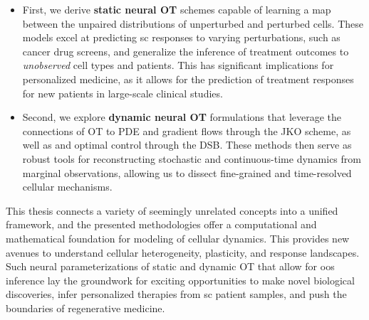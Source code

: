 \begin{itemize}[leftmargin=*]
	\item First, we derive \textbf{static neural \acrlong{OT}} schemes capable of learning a map between the unpaired distributions of unperturbed and perturbed cells. These models excel at predicting \acrlong{sc} responses to varying perturbations, such as cancer drug screens, and generalize the inference of treatment outcomes to \emph{unobserved} cell types and patients.
This has significant implications for personalized medicine, as it allows for the prediction of treatment responses for new patients in large-scale clinical studies.

	\item Second, we explore \textbf{dynamic neural \acrlong{OT}} formulations that leverage the connections of \acrshort{OT} to \acrlong{PDE} and gradient flows through the \acrfull{JKO} scheme, as well as  and optimal control through the \acrfull{DSB}. These methods then serve as robust tools for reconstructing stochastic and continuous-time dynamics from marginal observations, allowing us to dissect fine-grained and time-resolved cellular mechanisms.
\end{itemize}

This thesis connects a variety of seemingly unrelated concepts into a unified framework, and the presented methodologies offer a computational and mathematical foundation for modeling of cellular dynamics. This provides new avenues to understand cellular heterogeneity, plasticity, and response landscapes.
Such neural parameterizations of static and dynamic \acrshort{OT} that allow for \acrlong{oos} inference lay the groundwork for exciting opportunities to make novel biological discoveries, infer personalized  therapies from \acrlong{sc} patient samples, and push the boundaries of regenerative medicine.

\endgroup

\cleardoublepage%

\begingroup
\let\clearpage\relax
\let\cleardoublepage\relax
\let\cleardoublepage\relax

